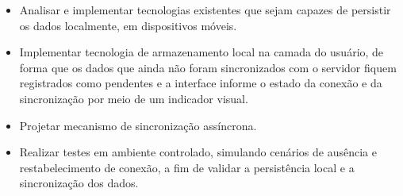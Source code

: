 	\begin{itemize}
     \renewcommand\labelitemi{-}
		\item Analisar e implementar tecnologias existentes que sejam capazes de persistir os dados localmente, em dispositivos móveis.
		\item Implementar tecnologia de armazenamento local na camada do usuário, de forma que os dados que ainda não foram sincronizados com o servidor fiquem registrados como pendentes e a interface informe o estado da conexão e da sincronização por meio de um indicador visual.
        \item Projetar mecanismo de sincronização assíncrona.
		\item Realizar testes em ambiente controlado, simulando cenários de ausência e restabelecimento de conexão, a fim de validar a persistência local e a sincronização dos dados.
	\end{itemize}
